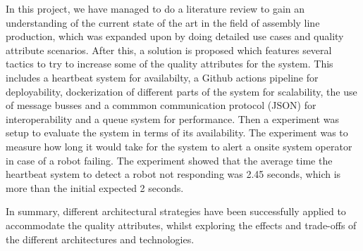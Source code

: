 
In this project, we have managed to do a literature review to gain an understanding of the current state of the art in the field of assembly line production, which was expanded upon by doing detailed use cases and quality attribute scenarios. After this, a solution is proposed which features several tactics to try to increase some of the quality attributes for the system. This includes a heartbeat system for availabilty, a Github actions pipeline for deployability, dockerization of different parts of the system for scalability, the use of message busses and a commmon communication protocol (JSON) for interoperability and a queue system for performance. Then a experiment was setup to evaluate the system in terms of its availability. The experiment was to measure how long it would take for the system to alert a onsite system operator in case of a robot failing. The experiment showed that the average time the heartbeat system to detect a robot not responding was 2.45 seconds, which is more than the initial expected 2 seconds. 

In summary, different architectural strategies have been successfully applied to accommodate the quality attributes, whilst exploring the effects and trade-offs of the different architectures and technologies.

